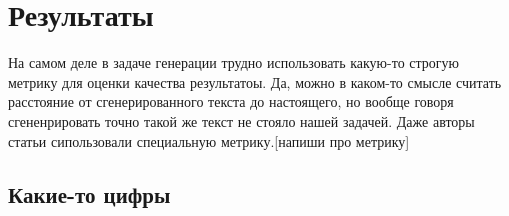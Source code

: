 \documentclass{spbau-diploma}
\begin{document}
\section{Результаты}
На самом деле в задаче генерации трудно использовать какую-то строгую метрику для оценки качества результатоы. Да, можно в каком-то смысле считать расстояние от сгенерированного текста до настоящего, но вообще говоря сгененрировать точно такой же текст не стояло нашей задачей. Даже авторы статьи сипользовали специальную метрику.[напиши про метрику] 
\subsection{Какие-то цифры}



\end{document}
